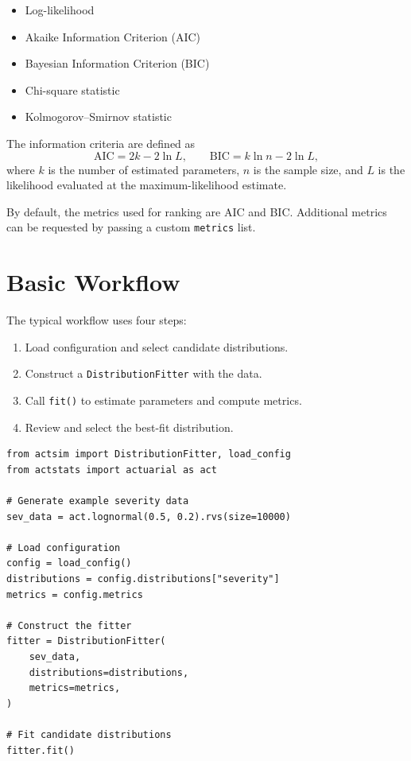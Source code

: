 \begin{itemize}[leftmargin=*]
    \item Log-likelihood
    \item Akaike Information Criterion (AIC)
    \item Bayesian Information Criterion (BIC)
    \item Chi-square statistic
    \item Kolmogorov--Smirnov statistic
\end{itemize}

The information criteria are defined as
\[
    \mathrm{AIC} = 2k - 2\ln L, \qquad
    \mathrm{BIC} = k \ln n - 2 \ln L,
\]
where $k$ is the number of estimated parameters, $n$ is the sample size,
and $L$ is the likelihood evaluated at the maximum-likelihood estimate.

By default, the metrics used for ranking are AIC and BIC. Additional
metrics can be requested by passing a custom \texttt{metrics} list.

\section{Basic Workflow}

The typical workflow uses four steps:

\begin{enumerate}[leftmargin=*]
    \item Load configuration and select candidate distributions.
    \item Construct a \texttt{DistributionFitter} with the data.
    \item Call \texttt{fit()} to estimate parameters and compute metrics.
    \item Review and select the best-fit distribution.
\end{enumerate}

\begin{lstlisting}[style=pythonstyle]
from actsim import DistributionFitter, load_config
from actstats import actuarial as act

# Generate example severity data
sev_data = act.lognormal(0.5, 0.2).rvs(size=10000)

# Load configuration
config = load_config()
distributions = config.distributions["severity"]
metrics = config.metrics

# Construct the fitter
fitter = DistributionFitter(
    sev_data,
    distributions=distributions,
    metrics=metrics,
)

# Fit candidate distributions
fitter.fit()
\end{lstlisting}

